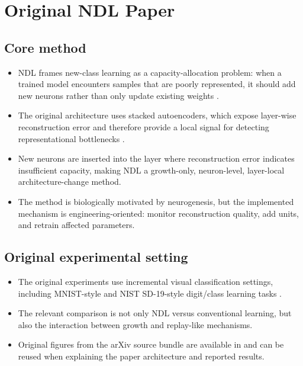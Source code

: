 \section{Original NDL Paper}

\subsection{Core method}
\begin{itemize}
  \item NDL frames new-class learning as a capacity-allocation problem: when a trained model encounters samples that are poorly represented, it should add new neurons rather than only update existing weights \parencite{draelos2017neurogenesis}.
  \item The original architecture uses stacked autoencoders, which expose layer-wise reconstruction error and therefore provide a local signal for detecting representational bottlenecks \parencite{draelos2017neurogenesis}.
  \item New neurons are inserted into the layer where reconstruction error indicates insufficient capacity, making NDL a growth-only, neuron-level, layer-local architecture-change method.
  \item The method is biologically motivated by neurogenesis, but the implemented mechanism is engineering-oriented: monitor reconstruction quality, add units, and retrain affected parameters.
\end{itemize}

\subsection{Original experimental setting}
\begin{itemize}
  \item The original experiments use incremental visual classification settings, including MNIST-style and NIST SD-19-style digit/class learning tasks \parencite{draelos2017neurogenesis}.
  \item The relevant comparison is not only NDL versus conventional learning, but also the interaction between growth and replay-like mechanisms.
  \item Original figures from the arXiv source bundle are available in  and can be reused when explaining the paper architecture and reported results.
\end{itemize}

